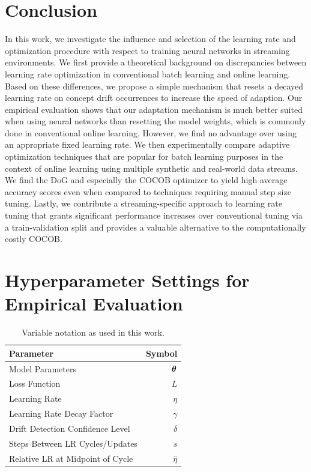 \documentclass{article} %
\begin{document}
\section{Conclusion}

In this work, we investigate the influence and selection of the learning rate and optimization procedure with respect to training neural networks in streaming environments.
We first provide a theoretical background on discrepancies between learning rate optimization in conventional batch learning and online learning.
Based on these differences, we propose a simple mechanism that resets a decayed learning rate on concept drift occurrences to increase the speed of adaption.
Our empirical evaluation shows that our adaptation mechanism is much better suited when using neural networks than resetting the model weights, which is commonly done in conventional online learning.
However, we find no advantage over using an appropriate fixed learning rate.
We then experimentally compare adaptive optimization techniques that are popular for batch learning purposes in the context of online learning using multiple synthetic and real-world data streams.
We find the DoG and especially the COCOB optimizer to yield high average accuracy scores even when compared to techniques requiring manual step size tuning.
Lastly, we contribute a streaming-specific approach to learning rate tuning that grants significant performance increases over conventional tuning via a train-validation split and provides a valuable alternative to the computationally costly COCOB.




\appendix
\section{Hyperparameter Settings for Empirical Evaluation}\label{app:hyperparams}

\begin{table}[h]
   \centering
   \caption{Variable notation as used in this work.}
   \begin{tabular}{lr}
      \toprule
      Parameter                        & Symbol       \\
      \midrule
      Model Parameters                 & ${\bm{\theta}} $   \\
      Loss Function                    & $L$          \\
      Learning Rate                    & $\eta$       \\
      Learning Rate Decay Factor       & $\gamma$     \\
      Drift Detection Confidence Level & $\delta$     \\
      Steps Between LR Cycles/Updates  & $s$          \\
      Relative LR at Midpoint of Cycle & $\hat{\eta}$ \\
      \bottomrule
   \end{tabular}
\end{table}
\end{document}
